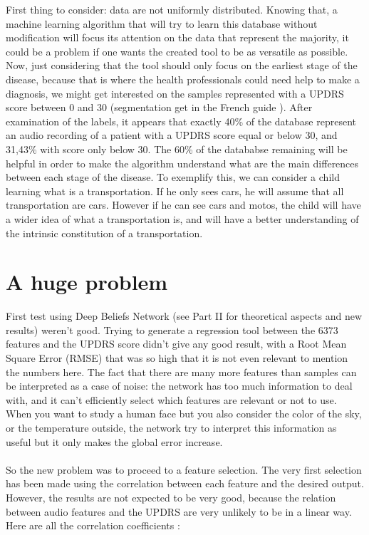 \documentclass{report}
\begin{document}
		
		First thing to consider: data are not uniformly distributed. Knowing that, a machine learning algorithm that will try to learn this database without modification will focus its attention on the data that represent the majority, it could be a problem if one wants the created tool to be as versatile as possible. Now, just considering that the tool should only focus on the earliest stage of the disease, because that is where the health professionals could need help to make a diagnosis, we might get interested on the samples represented with a UPDRS score between 0 and 30 (segmentation get in the French guide \cite{huang2007hybrid}). After examination of the labels, it appears that exactly 40\% of the database represent an audio recording of a patient with a UPDRS score equal or below 30, and 31,43\% with score only below 30. The 60\% of the datababse remaining will be helpful in order to make the algorithm understand what are the main differences between each stage of the disease. To exemplify this, we can consider a child learning what is a transportation. If he only sees cars, he will assume that all transportation are cars. However if he can see cars and motos, the child will have a wider idea of what a transportation is, and will have a better understanding of the intrinsic constitution of a transportation.
		
		\section{A huge problem}
		
		First test using Deep Beliefs Network (see Part II for theoretical aspects and new results) weren't good. Trying to generate a regression tool between the 6373 features and the UPDRS score didn't give any good result, with a Root Mean Square Error (RMSE) that was so high that it is not even relevant to mention the numbers here. The fact that there are many more features than samples can be interpreted as a case of noise: the network has too much information to deal with, and it can't efficiently select which features are relevant or not to use. When you want to study a human face but you also consider the color of the sky, or the temperature outside, the network try to interpret this information as useful but it only makes the global error increase.\\\\
		So the new problem was to proceed to a feature selection. The very first selection has been made using the correlation between each feature and the desired output. However, the results are not expected to be very good, because the relation between audio features and the UPDRS are very unlikely to be in a linear way. Here are all the correlation coefficients :
		\\
\end{document}
